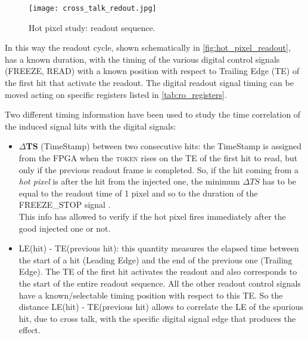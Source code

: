 \begin{figure}[h!]
\centering
\texttt{[image: cross\_talk\_redout.jpg]}
\caption{Hot pixel study: readout sequence.}
\label{fig:hot_pixel_readout}
\end{figure}

In this way the readout cycle, shown schematically in \autoref{fig:hot_pixel_readout}, has a known duration, with the timing of the various digital control signals (FREEZE, READ) with a known position with respect to Trailing Edge (TE) of the first hit that activate the readout. The digital readout signal timing can be moved acting on specific registers listed in \autoref{tab:ro_registers}. 

Two different timing information have been used to study the time correlation of the induced signal hits with the digital signals:

\begin{itemize}
\item \textbf{$\Delta$TS} (TimeStamp) between two consecutive hits: the TimeStamp is assigned from the FPGA when the \textsc{token} rises on the TE of the first hit to read, but only if the previous readout frame is completed. So, if the hit coming from a \textit{hot pixel} is after the hit from the injected one, the minimum $\Delta TS$ has to be equal to the readout time of 1 pixel and so to the duration of the \textsc{FREEZE\_STOP} signal .\\
This info has allowed to verify if the hot pixel fires immediately after the good injected one or not.
\item LE(hit) - TE(previous hit): this quantity measures the elapsed time between the start of a hit (Leading Edge) and the end of the previous one (Trailing Edge). The TE of the first hit  activates the readout and also corresponds to the start of the entire readout sequence.  All the other readout control signals have a known/selectable timing position with respect to this TE. So the distance LE(hit) - TE(previous hit) allows to correlate the LE of the spurious hit, due to cross talk, with the specific digital signal edge that produces the effect. 
\end{itemize}



